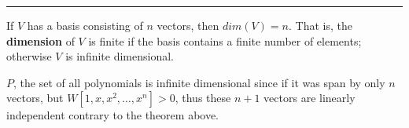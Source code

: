  
 
 
 
 
 
 
\rule[0.01in]{\textwidth}{0.0025in}







\begin{definition}
	If $V$ has a basis consisting of $n$ vectors, then $dim(V) = n$.  That is, the \textbf{dimension} of $V$ is finite if the basis contains a finite number of elements; otherwise $V$ is infinite dimensional.
\end{definition}




\begin{example}
	$P$, the set of all polynomials is infinite dimensional since if it was span by only $n$ vectors, but $W[1, x, x^2, \dots, x^n] >0$, thus these $n+1$ vectors are linearly independent contrary to the theorem above.
\end{example}





